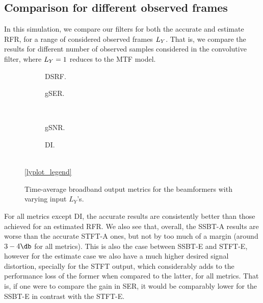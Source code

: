 \subsection{Comparison for different observed frames}

In this simulation, we compare our filters for both the accurate and estimate RFR, for a range of considered observed frames $\Ly$. That is, we compare the results for different number of observed samples considered in the convolutive filter, where $\Ly = 1$ reduces to the MTF model.

\begin{figure}[t]
	\centering
	\begin{subfigure}{0.49\textwidth}
		\centering
		
		\caption{DSRF.}
		\label{subfig:lineplot__DSRF__iSER_n15__Ly_var}
	\end{subfigure}\hfill
	\begin{subfigure}{0.49\textwidth}
		\centering
		
		\caption{gSER.}
		\label{subfig:lineplot__gSER__iSER_n15__Ly_var}
	\end{subfigure}\\[1em]
	\begin{subfigure}{0.49\textwidth}
		\centering
		
		\caption{gSNR.}
		\label{subfig:lineplot__gSNR__iSER_n15__Ly_var}
	\end{subfigure}\hfill
	\begin{subfigure}{0.49\textwidth}
		\centering
		
		\caption{DI.}
		\label{subfig:lineplot__DI__iSER_n15__Ly_var}
	\end{subfigure}\\[1em]
	\ref*{lyplot_legend}
	\caption{Time-average broadband output metrics for the beamformers with varying input $L_Y$'s.}
	\label{fig:lineplot__iSER_n15__Ly_var}
\end{figure}

For all metrics except DI, the accurate results are consistently better than those achieved for an estimated RFR. We also see that, overall, the SSBT-A results are worse than the accurate STFT-A ones, but not by too much of a margin (around $3-4\dB$ for all metrics). This is also the case between SSBT-E and STFT-E, however for the estimate case we also have a much higher desired signal distortion, specially for the STFT output, which considerably adds to the performance loss of the former when compared to the latter, for all metrics. That is, if one were to compare the gain in SER, it would be comparably lower for the SSBT-E in contrast with the STFT-E.

